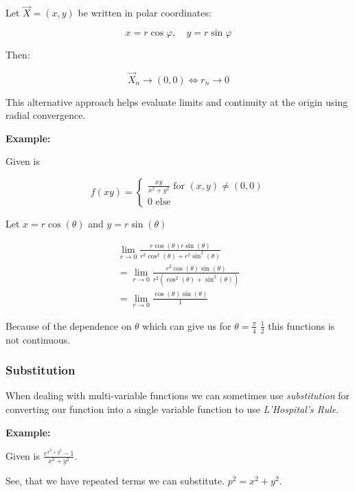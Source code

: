 Let \( \vec{X} = (x, y) \) be written in polar coordinates:

\[
    x = r \cos \varphi, \quad y = r \sin \varphi
\]

Then:

\[
    \vec{X}_n \to (0, 0) \iff r_n \to 0
\]

This alternative approach helps evaluate limits and continuity at the origin using radial convergence.
\vspace{\baselineskip}

\textbf{Example:}
\vspace{\baselineskip}

Given is 

\[
    f(xy) = 
    \begin{cases}   
    \frac{xy}{x^2 + y^2} \text{ for } (x,y) \ne (0,0) \\ 
    0 \text{ else }
    \end{cases}
\]

Let \(x = r\cos(\theta)\) and \(y = r\sin(\theta)\)

\begin{align*}
    \lim_{r \to 0} \frac{r\cos(\theta)r\sin(\theta)}{r^2\cos^2(\theta) + r^2\sin^2(\theta)}\\
    = \lim_{r \to 0} \frac{r^2\cos(\theta)\sin(\theta)}{r^2(\cos^2(\theta) + \sin^2(\theta))}\\
    = \lim_{r \to 0} \frac{\cos(\theta)\sin(\theta)}{1}
\end{align*}

Because of the dependence on \(\theta\) which can give us for \(\theta = \frac{\pi}{4}\) \(\frac{1}{2}\) 
this functions is not continuous.

\subsubsection{Substitution}

When dealing with multi-variable functions we can sometimes use \emph{substitution} 
for converting our function into a single variable function to use \emph{L'Hospital's Rule}.
\vspace{\baselineskip}

\textbf{Example:}
\vspace{\baselineskip}

Given is \(\frac{e^{x^2 + y^2} - 1}{x^2 + y^2}\).
\vspace{\baselineskip}

See, that we have repeated terms we can substitute. \(p^2 = x^2 + y^2\).

